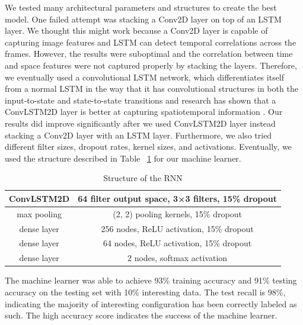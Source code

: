 \documentclass[12pt]{article}
\numberwithin{figure}{section} %
\begin{document}
We tested many architectural parameters and structures to create the best model. One failed attempt was stacking a Conv2D layer on top of an LSTM layer. We thought this might work because a Conv2D layer is capable of capturing image features and LSTM can detect temporal correlations across the frames. However, the results were suboptimal and the correlation between time and space features were not captured properly by stacking the layers. Therefore, we eventually used a convolutional LSTM network, which differentiates itself from a normal LSTM in the way that it has convolutional structures in both the input-to-state and state-to-state transitions and research has shown that a ConvLSTM2D layer is better at capturing spatiotemporal information \cite{ConvLSTM}. Our results did improve significantly after we used ConvLSTM2D layer instead stacking a Conv2D layer with an LSTM layer. Furthermore, we also tried different filter sizes, dropout rates, kernel sizes, and activations. Eventually, we used the structure described in Table ~\ref{table:CNN structure} for our machine learner. 
\begin{table}[H]
\begin{center}
\begin{tabular}{ | c | c | } 
\hline
ConvLSTM2D & 64 filter output space, 3×3 filters, 15\% dropout \\ 
\hline
max pooling & (2, 2) pooling kernels, 15\% dropout  \\ 
\hline
dense layer & 256 nodes, ReLU activation, 15\% dropout  \\ 
\hline
dense layer & 64 nodes, ReLU activation, 15\% dropout  \\ 
\hline
dense layer & 2 nodes, softmax activation \\
\hline
\end{tabular}
\caption{Structure of the RNN}
\label{table:CNN structure}
\vspace{-2.5em}
\end{center}
\end{table}
The machine learner was able to achieve 93\% training accuracy and 91\% testing accuracy on the testing set with 10\% interesting data. The test recall is 98\%, indicating the majority of interesting configuration has been correctly labeled as such. The high accuracy score indicates the success of the machine learner. 
\end{document}
